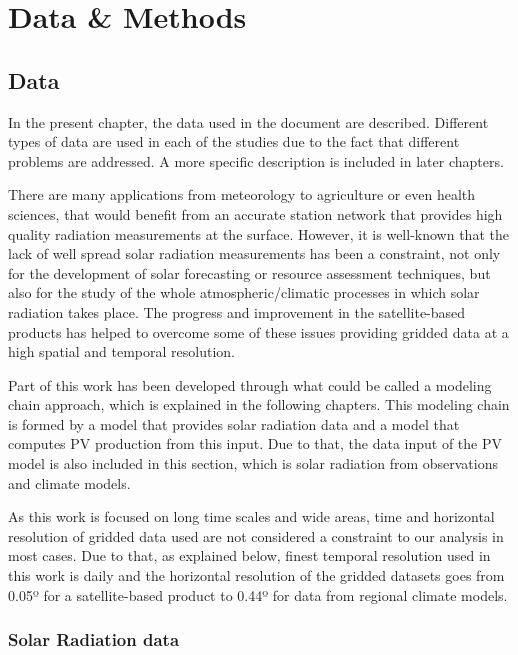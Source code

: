 \part{Data \& Methods\label{cha:datamethods}}

   
\chapter{Data\label{cha:Data}}

  In the present chapter, the data used in the document are described. Different types of data are used in each of the studies due to the fact that different problems are addressed. A more specific description is included in later chapters.

  There are many applications from meteorology to agriculture or even health sciences, that would benefit from an accurate station network that provides high quality radiation measurements at the surface. However, it is well-known that the lack of  well spread solar radiation measurements has been a constraint, not only for the development of solar forecasting or resource assessment techniques, but also for the study of the whole atmospheric/climatic processes in which solar radiation takes place. The progress and improvement in the satellite-based products has helped to overcome some of these issues providing gridded data at a high spatial and temporal resolution.

  Part of this work has been developed through what could be called a modeling chain approach, which is explained in the following chapters. This modeling chain is formed by a model that provides solar radiation data and a model that computes PV production from this input. Due to that, the data input of the PV model is also included in this section, which is solar radiation from observations and climate models.

  As this work is focused on long time scales and wide areas, time and horizontal resolution of gridded data used are not considered a constraint to our analysis in most cases. Due to that, as explained below, finest temporal resolution used in this work is daily and the horizontal resolution of the gridded datasets goes from 0.05º for a satellite-based product to 0.44º for data from regional climate models.     
\section{Solar Radiation data}

